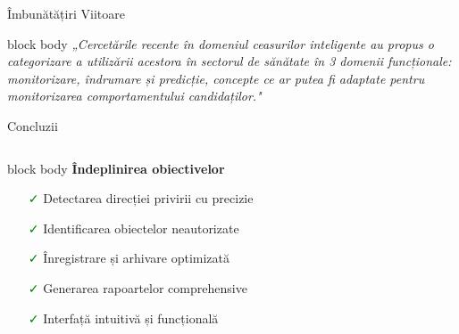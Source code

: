 \documentclass[aspectratio=169,9pt]{beamer}
\begin{document}
\begin{frame}{Îmbunătățiri Viitoare}
        \begin{beamercolorbox}[rounded=true,shadow=true,sep=0.5em]{block body}
                \centering
                \footnotesize\itshape
                „Cercetările recente în domeniul ceasurilor inteligente au propus o categorizare a utilizării acestora 
                în sectorul de sănătate în 3 domenii funcționale: monitorizare, îndrumare și predicție, 
                concepte ce ar putea fi adaptate pentru monitorizarea comportamentului candidaților."
        \end{beamercolorbox}
\end{frame}

\begin{frame}{Concluzii}
        \vspace{-0.6cm}
        \begin{columns}
                        \begin{beamercolorbox}[rounded=true,shadow=true,sep=0.7em]{block body}
                                \centering\textcolor{mainblue}{\textbf{\small Îndeplinirea obiectivelor}}
                                \vspace{0.1cm}
                                
                                \footnotesize
                                \begin{itemize}[leftmargin=0.5cm,itemsep=0.05cm]
                                        \item[\textcolor{green}{\faCheck}] Detectarea direcției privirii cu precizie
                                        \item[\textcolor{green}{\faCheck}] Identificarea obiectelor neautorizate
                                        \item[\textcolor{green}{\faCheck}] Înregistrare și arhivare optimizată
                                        \item[\textcolor{green}{\faCheck}] Generarea rapoartelor comprehensive
                                        \item[\textcolor{green}{\faCheck}] Interfață intuitivă și funcțională
                                \end{itemize}
                        \end{beamercolorbox}
                        
                        \vspace{0.2cm}
                        

\end{columns}
\end{frame}
\end{document}
